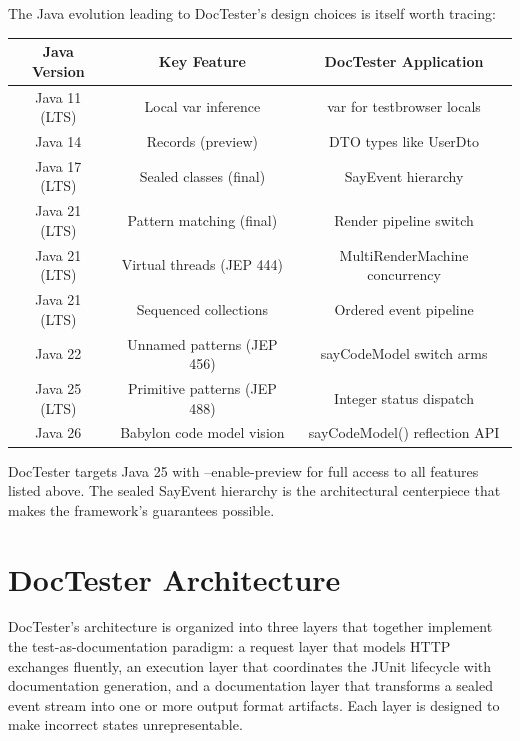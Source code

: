 \documentclass[11pt]{article}
\begin{document}
The Java evolution leading to DocTester's design choices is itself worth tracing:

\begin{table}[h]
\centering
\begin{tabular}{|c|c|c|}
\hline
\textbf{Java Version} & \textbf{Key Feature} & \textbf{DocTester Application} \\
\hline
Java 11 (LTS) & Local var inference & var for testbrowser locals \\
Java 14 & Records (preview) & DTO types like UserDto \\
Java 17 (LTS) & Sealed classes (final) & SayEvent hierarchy \\
Java 21 (LTS) & Pattern matching (final) & Render pipeline switch \\
Java 21 (LTS) & Virtual threads (JEP 444) & MultiRenderMachine concurrency \\
Java 21 (LTS) & Sequenced collections & Ordered event pipeline \\
Java 22 & Unnamed patterns (JEP 456) & sayCodeModel switch arms \\
Java 25 (LTS) & Primitive patterns (JEP 488) & Integer status dispatch \\
Java 26 & Babylon code model vision & sayCodeModel() reflection API \\
\hline
\end{tabular}
\end{table}


\begin{tcolorbox}[colback=notebg,colframe=blue!50!black,title={\textbf{Note}}]
DocTester targets Java 25 with --enable-preview for full access to all features listed above. The sealed SayEvent hierarchy is the architectural centerpiece that makes the framework's guarantees possible.
\end{tcolorbox}


\section{DocTester Architecture}
\label{sec:architecture}

DocTester's architecture is organized into three layers that together implement the test-as-documentation paradigm: a request layer that models HTTP exchanges fluently, an execution layer that coordinates the JUnit lifecycle with documentation generation, and a documentation layer that transforms a sealed event stream into one or more output format artifacts. Each layer is designed to make incorrect states unrepresentable.
\end{document}
